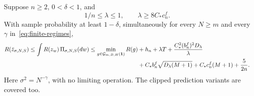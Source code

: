 \begin{theorem}
\label{thm:finite-oracle}
Suppose $n\geq2$, $0<\delta<1$, and
\begin{equation}
 1/n\leq\lambda\leq1,\qquad \lambda\geq8C_*c_n^f.
 \label{eq:finite-calibration-condition}
\end{equation}
With sample probability at least $1-\delta$, simultaneously for every $N\geq m$ and every $\gamma$ in~\eqref{eq:finite-regimes},
\begin{align}
 R(\bar z_{\sigma,N,S})
 \leq\int R(z_w)\,\Pi_{\sigma,N,S}(dw)
 \leq\min_{g\in\mathcal G_{m,B,H}(\boldsymbol1)}R(g)
 &+h_n+\lambda T+\frac{C_*^2(b_n^f)^2D_\lambda}{\lambda}\notag\\
 &+C_*b_n^f\sqrt{D_\lambda(M+1)}
    +C_*c_n^f(M+1)+\frac5{2n}.
 \label{eq:finite-oracle}
\end{align}
Here $\sigma^2=N^{-\gamma}$, with no limiting operation. The clipped prediction variants are covered too.
\end{theorem}
